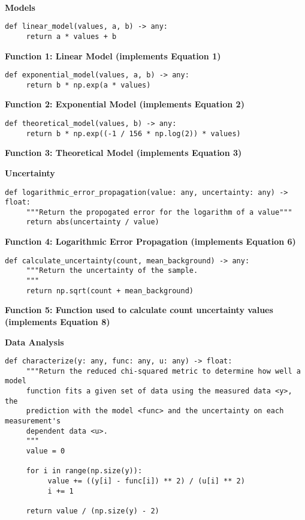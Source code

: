 \documentclass[
	letterpaper, %
	10pt, %
]{CSUniSchoolLabReport}
\begin{document}
\vspace{20pt}\\
{\large\textbf{Models}}
\begin{verbatim}
def linear_model(values, a, b) -> any:
     return a * values + b
\end{verbatim}
\begin{center}
	\textbf{Function 1: Linear Model (implements Equation 1)}
\end{center}
\vspace{5pt}
\begin{verbatim}
def exponential_model(values, a, b) -> any:
     return b * np.exp(a * values)
\end{verbatim}
\begin{center}
	\textbf{Function 2: Exponential Model (implements Equation 2)}
\end{center}
\vspace{5pt}
\begin{verbatim}
def theoretical_model(values, b) -> any:
     return b * np.exp((-1 / 156 * np.log(2)) * values)
\end{verbatim}
\begin{center}
	\textbf{Function 3: Theoretical Model (implements Equation 3)}
\end{center}
\vspace{10pt}
{\large\textbf{Uncertainty}}
\begin{verbatim}
def logarithmic_error_propagation(value: any, uncertainty: any) -> float:
     """Return the propogated error for the logarithm of a value"""
     return abs(uncertainty / value)
\end{verbatim}
\begin{center}
	\textbf{Function 4: Logarithmic Error Propagation (implements Equation 6)}
\end{center}
\vspace{10pt}
\begin{verbatim}
def calculate_uncertainty(count, mean_background) -> any:
     """Return the uncertainty of the sample.
     """
     return np.sqrt(count + mean_background)
\end{verbatim}
\begin{center}
	\textbf{Function 5: Function used to calculate count uncertainty values (implements Equation 8)}
\end{center}
\vspace{10pt}
{\large\textbf{Data Analysis}}
\begin{verbatim}
def characterize(y: any, func: any, u: any) -> float:
     """Return the reduced chi-squared metric to determine how well a model
     function fits a given set of data using the measured data <y>, the
     prediction with the model <func> and the uncertainty on each measurement's
     dependent data <u>.
     """
     value = 0

     for i in range(np.size(y)):
          value += ((y[i] - func[i]) ** 2) / (u[i] ** 2)
          i += 1

     return value / (np.size(y) - 2)
\end{verbatim}
\end{document}
